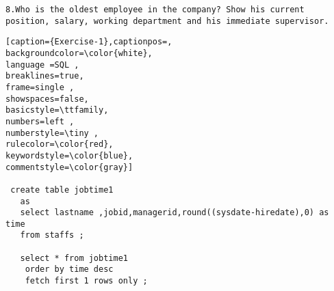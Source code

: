 \documentclass[12pt,a4paper]{article}
\begin{document}
\vspace{1cm}
{\tt{8.Who is the oldest employee in the company? Show his current position, salary, working 
department and his immediate supervisor.
\\}}


\begin{lstlisting}[caption={Exercise-1},captionpos=,
backgroundcolor=\color{white},
language =SQL ,
breaklines=true,
frame=single ,
showspaces=false,
basicstyle=\ttfamily,
numbers=left ,
numberstyle=\tiny ,
rulecolor=\color{red},
keywordstyle=\color{blue},
commentstyle=\color{gray}]
 
 create table jobtime1
   as
   select lastname ,jobid,managerid,round((sysdate-hiredate),0) as time
   from staffs ; 
   
   select * from jobtime1
    order by time desc
    fetch first 1 rows only ;
 

\end{lstlisting} 
\end{document}
